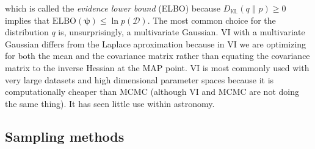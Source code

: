 \documentclass[12pt,dvipsnames]{report}
\begin{document}
which is called the \textsl{evidence lower bound} (ELBO) because
$D_{\mathbb{K} \mathbb{L}}(q \| p) \geq 0$ implies that
$\mathrm{ELBO}(\boldsymbol{\psi}) \leq \ln p(\mathcal{D})$.
The most common choice for the distribution $q$ is, unsurprisingly, a multivariate
Gaussian. VI with a multivariate Gaussian differs from  the Laplace aproximation
because  in VI we are optimizing for both the mean and the covariance matrix rather
than equating the covariance matrix to the inverse Hessian at the MAP point.
VI is most commonly used with very large datasets and high dimensional parameter
spaces because it is computationally cheaper than MCMC (although VI and MCMC are not
doing the same thing). It has seen little use within astronomy.

\subsection{Sampling methods}
\label{ssec:sampling_methods}
\end{document}
